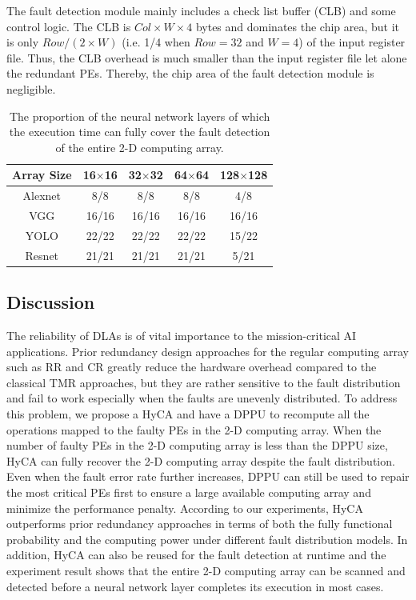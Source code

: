 The fault detection module mainly includes a check list buffer (CLB) and some control logic. The CLB is $Col \times W \times 4$ bytes and dominates the chip area, but it is only $Row/(2\times W)$ (i.e. 1/4 when $Row = 32$ and $W = 4$) of the input register file. Thus, the CLB overhead is much smaller than the input register file let alone the redundant PEs. Thereby, the chip area of the fault detection module is negligible.


\begin{table}[]
\setlength{\abovedisplayskip}{3pt}
\setlength{\belowdisplayskip}{3pt}
\centering
\setlength{\tabcolsep}{2mm}
\caption{The proportion of the neural network layers of which the execution time can fully cover the fault detection of the entire 2-D computing array.}
\begin{tabular}{@{}ccccc}
\hline
 Array Size       & 16$\times$16  & 32$\times$32  & 64$\times$64  & 128$\times$128 \\     \hline
Alexnet & 8/8           & 8/8           & 8/8           & 4/8     \\            
VGG     & 16/16         & 16/16         & 16/16         & 16/16   \\            
YOLO    & 22/22         & 22/22         & 22/22         & 15/22   \\            
Resnet  & 21/21         & 21/21         & 21/21         & 5/21    \\            \hline
\end{tabular}
\label{detection}
\vspace{-1em}
\end{table}

\subsection{Discussion}
The reliability of DLAs is of vital importance to the mission-critical AI applications. Prior redundancy design approaches for the regular computing array such as RR and CR greatly reduce the hardware overhead compared to the classical TMR approaches, but they are rather sensitive to the fault distribution and fail to work especially when the faults are unevenly distributed. To address this problem, we propose a HyCA and have a DPPU to recompute all the operations mapped to the faulty PEs in the 2-D computing array. When the number of faulty PEs in the 2-D computing array is less than the DPPU size, HyCA can fully recover the 2-D computing array despite the fault distribution. Even when the fault error rate further increases, DPPU can still be used to repair the most critical PEs first to ensure a large available computing array and minimize the performance penalty. According to our experiments, HyCA outperforms prior redundancy approaches in terms of both the fully functional probability and the computing power under different fault distribution models. In addition, HyCA can also be reused for the fault detection at runtime and the experiment result shows that the entire 2-D computing array can be scanned and detected before a neural network layer completes its execution in most cases.

